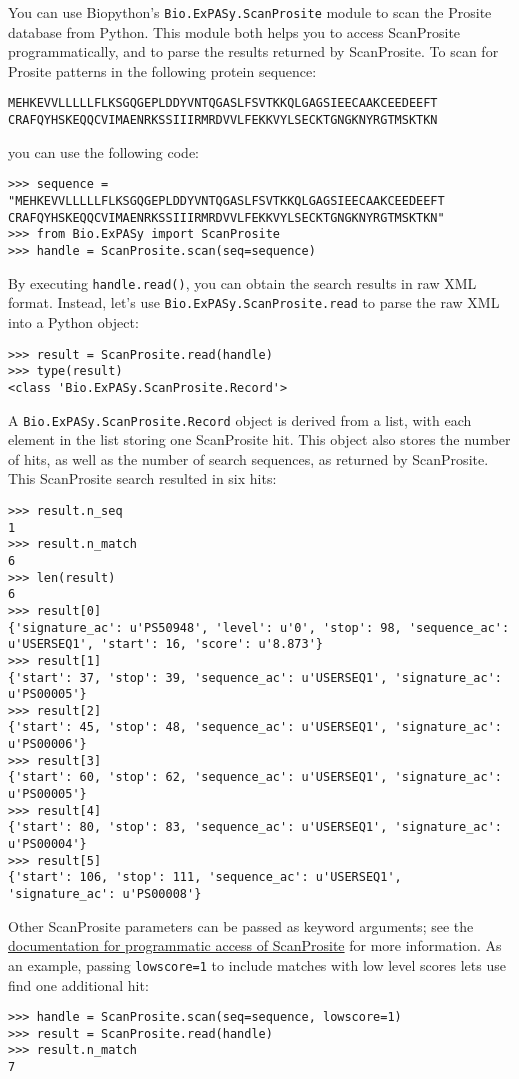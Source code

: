 You can use Biopython's \verb+Bio.ExPASy.ScanProsite+ module to scan the Prosite database from Python. This module both helps you to access ScanProsite programmatically, and to parse the results returned by ScanProsite. To scan for Prosite patterns in the following protein sequence:

\begin{verbatim}
MEHKEVVLLLLLFLKSGQGEPLDDYVNTQGASLFSVTKKQLGAGSIEECAAKCEEDEEFT
CRAFQYHSKEQQCVIMAENRKSSIIIRMRDVVLFEKKVYLSECKTGNGKNYRGTMSKTKN
\end{verbatim}

you can use the following code:

\begin{verbatim}
>>> sequence = "MEHKEVVLLLLLFLKSGQGEPLDDYVNTQGASLFSVTKKQLGAGSIEECAAKCEEDEEFT
CRAFQYHSKEQQCVIMAENRKSSIIIRMRDVVLFEKKVYLSECKTGNGKNYRGTMSKTKN"
>>> from Bio.ExPASy import ScanProsite
>>> handle = ScanProsite.scan(seq=sequence)
\end{verbatim}

By executing \verb+handle.read()+, you can obtain the search results in raw XML format. Instead, let's use \verb+Bio.ExPASy.ScanProsite.read+ to parse the raw XML into a Python object:

\begin{verbatim}
>>> result = ScanProsite.read(handle)
>>> type(result)
<class 'Bio.ExPASy.ScanProsite.Record'>
\end{verbatim}

A \verb+Bio.ExPASy.ScanProsite.Record+ object is derived from a list, with each element in the list storing one ScanProsite hit. This object also stores the number of hits, as well as the number of search sequences, as returned by ScanProsite. This ScanProsite search resulted in six hits:

\begin{verbatim}
>>> result.n_seq
1
>>> result.n_match
6
>>> len(result)
6
>>> result[0]
{'signature_ac': u'PS50948', 'level': u'0', 'stop': 98, 'sequence_ac': u'USERSEQ1', 'start': 16, 'score': u'8.873'}
>>> result[1]
{'start': 37, 'stop': 39, 'sequence_ac': u'USERSEQ1', 'signature_ac': u'PS00005'}
>>> result[2]
{'start': 45, 'stop': 48, 'sequence_ac': u'USERSEQ1', 'signature_ac': u'PS00006'}
>>> result[3]
{'start': 60, 'stop': 62, 'sequence_ac': u'USERSEQ1', 'signature_ac': u'PS00005'}
>>> result[4]
{'start': 80, 'stop': 83, 'sequence_ac': u'USERSEQ1', 'signature_ac': u'PS00004'}
>>> result[5]
{'start': 106, 'stop': 111, 'sequence_ac': u'USERSEQ1', 'signature_ac': u'PS00008'}
\end{verbatim}

Other ScanProsite parameters can be passed as keyword arguments; see the \href{https://prosite.expasy.org/scanprosite/scanprosite_doc.html#rest}{documentation for programmatic access of ScanProsite} for more information. As an example, passing \verb+lowscore=1+ to include matches with low level scores lets use find one additional hit:

\begin{verbatim}
>>> handle = ScanProsite.scan(seq=sequence, lowscore=1)
>>> result = ScanProsite.read(handle)
>>> result.n_match
7
\end{verbatim}


